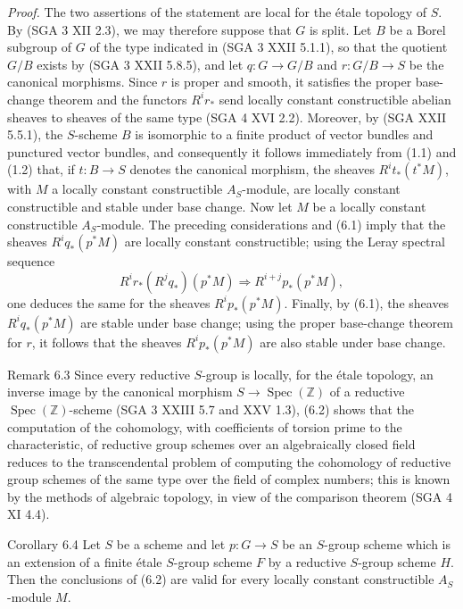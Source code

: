 \emph{Proof.} The two assertions of the statement are local for the étale topology of $S$. By (SGA 3 XII 2.3), we may therefore suppose that $G$ is split. Let $B$ be a Borel subgroup of $G$ of the type indicated in (SGA 3 XXII 5.1.1), so that the quotient $G/B$ exists by (SGA 3 XXII 5.8.5), and let $q:G\to G/B$ and $r:G/B\to S$ be the canonical morphisms. Since $r$ is proper and smooth, it satisfies the proper base-change theorem and the functors $R^ir_*$ send locally constant constructible abelian sheaves to sheaves of the same type (SGA 4 XVI 2.2). Moreover, by (SGA  XXII 5.5.1), the $S$-scheme $B$ is isomorphic to a finite product of vector bundles and punctured vector bundles, and consequently it follows immediately from (1.1) and (1.2) that, if $t:B\to S$ denotes the canonical morphism, the sheaves $R^it_*(t^*M)$, with $M$ a locally constant constructible $A_S$-module, are locally constant constructible and stable under base change. Now let $M$ be a locally constant constructible $A_S$-module. The preceding considerations and (6.1) imply that the sheaves $R^iq_*(p^*M)$ are locally constant constructible; using the Leray spectral sequence
\[
R^ir_*(R^jq_*)(p^*M)\Rightarrow R^{i+j}p_*(p^*M),
\]
one deduces the same for the sheaves $R^ip_*(p^*M)$. Finally, by (6.1), the sheaves $R^iq_*(p^*M)$ are stable under base change; using the proper base-change theorem for $r$, it follows that the sheaves $R^ip_*(p^*M)$ are also stable under base change.

\begin{statement}{Remark 6.3}
Since every reductive $S$-group is locally, for the étale topology, an inverse image by the canonical morphism $S\to\operatorname{Spec}(\mathbb Z)$ of a reductive $\operatorname{Spec}(\mathbb Z)$-scheme (SGA 3 XXIII 5.7 and XXV 1.3), (6.2) shows that the computation of the cohomology, with coefficients of torsion prime to the characteristic, of reductive group schemes over an algebraically closed field reduces to the transcendental problem of computing the cohomology of reductive group schemes of the same type over the field of complex numbers; this is known by the methods of algebraic topology, in view of the comparison theorem (SGA 4 XI 4.4).
\end{statement}

\begin{statement}{Corollary 6.4}
Let $S$ be a scheme and let $p:G\to S$ be an $S$-group scheme which is an extension of a finite étale $S$-group scheme $F$ by a reductive $S$-group scheme $H$. Then the conclusions of (6.2) are valid for every locally constant constructible $A_S$-module $M$.
\end{statement}

